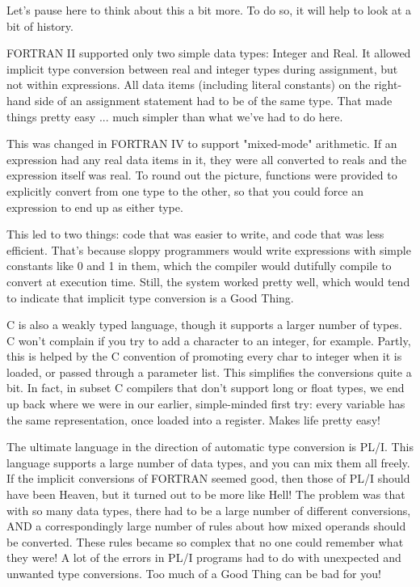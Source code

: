 \documentclass[float=false, crop=false]{standalone}
\begin{document}
Let's pause here to think about this a bit more. To do so, it will help to look
at a bit of history.

FORTRAN II supported only two simple data types: Integer and Real. It allowed
implicit type conversion between real and integer types during assignment, but
not within expressions. All data items (including literal constants) on the
right-hand side of an assignment statement had to be of the same type. That made
things pretty easy ... much simpler than what we've had to do here.

This was changed in FORTRAN IV to support "mixed-mode" arithmetic. If an
expression had any real data items in it, they were all converted to reals and
the expression itself was real. To round out the picture, functions were
provided to explicitly convert from one type to the other, so that you could
force an expression to end up as either type.

This led to two things: code that was easier to write, and code that was less
efficient. That's because sloppy programmers would write expressions with simple
constants like 0 and 1 in them, which the compiler would dutifully compile to
convert at execution time. Still, the system worked pretty well, which would
tend to indicate that implicit type conversion is a Good Thing.

C is also a weakly typed language, though it supports a larger number of types.
C won't complain if you try to add a character to an integer, for example.
Partly, this is helped by the C convention of promoting every char to integer
when it is loaded, or passed through a parameter list. This simplifies the
conversions quite a bit. In fact, in subset C compilers that don't support long
or float types, we end up back where we were in our earlier, simple-minded first
try: every variable has the same representation, once loaded into a register.
Makes life pretty easy!

The ultimate language in the direction of automatic type conversion is PL/I.
This language supports a large number of data types, and you can mix them all
freely. If the implicit conversions of FORTRAN seemed good, then those of PL/I
should have been Heaven, but it turned out to be more like Hell! The problem was
that with so many data types, there had to be a large number of different
conversions, AND a correspondingly large number of rules about how mixed
operands should be converted. These rules became so complex that no one could
remember what they were! A lot of the errors in PL/I programs had to do with
unexpected and unwanted type conversions. Too much of a Good Thing can be bad
for you!
\end{document}
